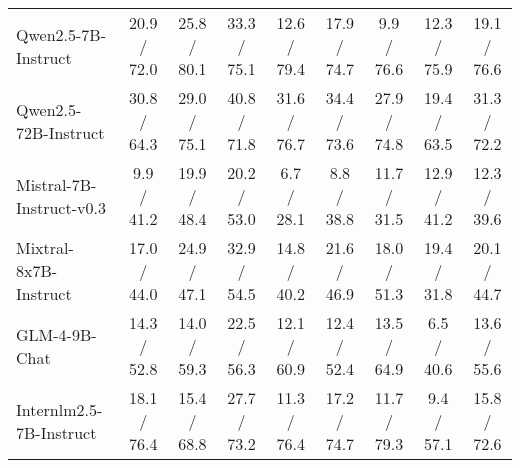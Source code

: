 \begin{table*}[!t]
{\begin{tabular}{l|cccccccc}
\multicolumn{1}{l|}{Qwen2.5-7B-Instruct} & 20.9 / 72.0 & 25.8 / 80.1 & 33.3 / 75.1 & 12.6 / 79.4 & 17.9 / 74.7 & 9.9 / 76.6 & 12.3 / 75.9 & 19.1 / 76.6 \\
\multicolumn{1}{l|}{Qwen2.5-72B-Instruct} & 30.8 / 64.3 & 29.0 / 75.1 & 40.8 / 71.8 & 31.6 / 76.7 & 34.4 / 73.6 & 27.9 / 74.8 & 19.4 / 63.5 & 31.3 / 72.2 \\
\multicolumn{1}{l|}{Mistral-7B-Instruct-v0.3} & 9.9 / 41.2 & 19.9 / 48.4 & 20.2 / 53.0 & 6.7 / 28.1 & 8.8 / 38.8 & 11.7 / 31.5 & 12.9 / 41.2 & 12.3 / 39.6 \\
\multicolumn{1}{l|}{Mixtral-8x7B-Instruct} & 17.0 / 44.0 & 24.9 / 47.1 & 32.9 / 54.5 & 14.8 / 40.2 & 21.6 / 46.9 & 18.0 / 51.3 & 19.4 / 31.8 & 20.1 / 44.7 \\
\multicolumn{1}{l|}{GLM-4-9B-Chat} & 14.3 / 52.8 & 14.0 / 59.3 & 22.5 / 56.3 & 12.1 / 60.9 & 12.4 / 52.4 & 13.5 / 64.9 & 6.5 / 40.6 & 13.6 / 55.6 \\
\multicolumn{1}{l|}{Internlm2.5-7B-Instruct} & 18.1 / 76.4 & 15.4 / 68.8 & 27.7 / 73.2 & 11.3 / 76.4 & 17.2 / 74.7 & 11.7 / 79.3 & 9.4 / 57.1 & 15.8 / 72.6 \\ \bottomrule
\end{tabular}
}
\end{table*}